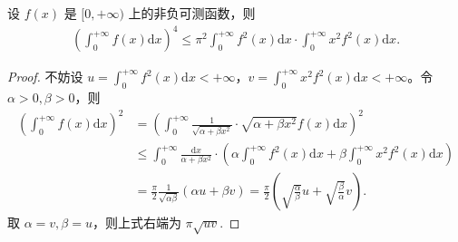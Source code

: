 \documentclass[../../main.tex]{subfiles}%
\begin{document}
\begin{example}
设 $f(x)$ 是 $[0, +\infty)$ 上的非负可测函数，则
\begin{align*}
\left( \int_0^{+\infty} f(x) \mathrm{d}x \right)^4 \leqslant \pi^2 \int_0^{+\infty} f^2(x) \mathrm{d}x \cdot \int_0^{+\infty} x^2 f^2(x) \mathrm{d}x.
\end{align*}
\end{example}
\begin{proof}
不妨设 $u = \int_0^{+\infty} f^2(x) \mathrm{d}x < +\infty$，$v = \int_0^{+\infty} x^2 f^2(x) \mathrm{d}x < +\infty$。令 $\alpha > 0, \beta > 0$，则
\begin{align*}
\left( \int_0^{+\infty} f(x) \mathrm{d}x \right)^2 &= \left( \int_0^{+\infty} \frac{1}{\sqrt{\alpha + \beta x^2}} \cdot \sqrt{\alpha + \beta x^2} f(x) \mathrm{d}x \right)^2 \\
&\leqslant \int_0^{+\infty} \frac{\mathrm{d}x}{\alpha + \beta x^2} \cdot \left( \alpha \int_0^{+\infty} f^2(x) \mathrm{d}x + \beta \int_0^{+\infty} x^2 f^2(x) \mathrm{d}x \right) \\
&= \frac{\pi}{2} \frac{1}{\sqrt{\alpha\beta}} (\alpha u + \beta v) = \frac{\pi}{2} \left( \sqrt{\frac{\alpha}{\beta}} u + \sqrt{\frac{\beta}{\alpha}} v \right).
\end{align*}
取 $\alpha = v, \beta = u$，则上式右端为 $\pi \sqrt{uv}$.
\end{proof}
\end{document}
